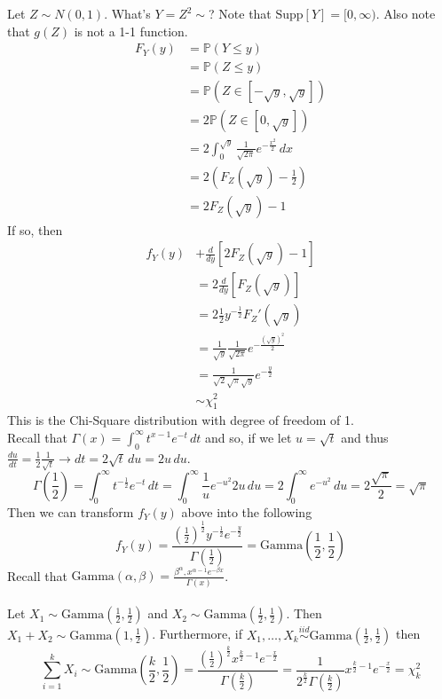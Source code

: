 \documentclass[12pt]{article}
\newcommand{\prob}[1]{\mathbb{P}(#1)}
\newcommand{\iid}{\stackrel{iid}{\sim}}
\newcommand{\supp}[1]{\text{Supp}[ #1 ]}
\begin{document}
Let $Z \sim N(0,1)$. What's $Y = Z^2 \sim$? Note that $\supp{Y} = [0, \infty)$. Also note that $g(Z)$ is not a 1-1 function. $$ \begin{aligned} F_Y(y) &= \prob{Y \leq y} \\ &= \prob{Z \leq y} \\ &= \prob{Z \in [-\sqrt{y}, \sqrt{y}]} \\ &= 2\prob{Z \in [0, \sqrt{y}]} \\ &= 2 \int_0^{\sqrt{y}} \frac{1}{\sqrt{2\pi}} e^{-\frac{x^2}{2}} \, dx \\ &= 2(F_Z(\sqrt{y}) - \frac{1}{2}) \\ &= 2F_Z(\sqrt{y}) - 1 \end{aligned} $$ If so, then $$ \begin{aligned} f_Y(y) &+ \frac{d}{dy} [2F_Z(\sqrt{y}) - 1] \\ &= 2 \frac{d}{dy} [F_Z(\sqrt{y})] \\ &= 2 \frac{1}{2}y^{-\frac{1}{2}}F_Z'(\sqrt{y}) \\ &= \frac{1}{\sqrt{y}}\frac{1}{\sqrt{2\pi}} e^{-\frac{(\sqrt{y})^2}{2}} \\ &= \frac{1}{\sqrt{2}\sqrt{\pi}\sqrt{y}}e^{-\frac{y}{2}} \\ &\sim \chi^2_1 \end{aligned} $$ This is the Chi-Square distribution with degree of freedom of 1. \\
Recall that $ \Gamma(x) = \int_0^\infty t^{x-1}e^{-t} \,dt$ and so, if we let $u = \sqrt{t}$ and thus $\frac{du}{dt} = \frac{1}{2}\frac{1}{\sqrt{t}} \to dt = 2 \sqrt{t} \, du = 2u\, du$.  $$ \Gamma(\frac{1}{2}) = \int_0^\infty t^{-\frac{1}{2}}e^{-t} \, dt = \int_0^\infty \frac{1}{u}e^{-u^2} 2u \, du = 2 \int_0^\infty e^{-u^2} \, du = 2 \frac{\sqrt{\pi}}{2} = \sqrt{\pi} $$ 
Then we can transform $f_Y(y)$ above into the following $$ f_Y(y) = \frac{(\frac{1}{2})^{\frac{1}{2}}y^{-\frac{1}{2}}e^{-\frac{y}{2}}}{\Gamma(\frac{1}{2})} = \text{Gamma}(\frac{1}{2}, \frac{1}{2}) $$ 
Recall that $\text{Gamma}(\alpha, \beta) = \frac{\beta^\alpha, x^{\alpha - 1} e^{-\beta x}}{\Gamma(x)}$. \\~\\
Let $X_1 \sim \text{Gamma}(\frac{1}{2}, \frac{1}{2})$ and $X_2 \sim \text{Gamma}(\frac{1}{2}, \frac{1}{2})$. Then $X_1 + X_2 \sim \text{Gamma}(1, \frac{1}{2})$. Furthermore, if $X_1, \dots, X_k \iid \text{Gamma}(\frac{1}{2}, \frac{1}{2})$ then $$\sum_{i = 1}^k X_i \sim \text{Gamma}(\frac{k}{2}, \frac{1}{2}) = \frac{(\frac{1}{2})^{\frac{k}{2}} x^{\frac{k}{2} - 1} e^{-\frac{x}{2}}}{\Gamma(\frac{k}{2})} = \frac{1}{2^{\frac{k}{2}} \Gamma(\frac{k}{2})} x^{\frac{k}{2} - 1} e^{-\frac{x}{2}} = \chi^2_k $$ 
\end{document}

